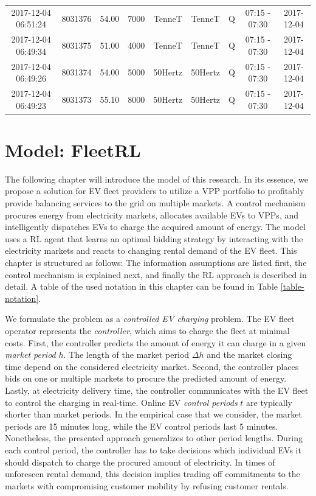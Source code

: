 \documentclass[a4paper, 12pt]{article}
\begin{document}
{\begin{table}
\begin{tabular}{c|cccccccc}
2017-12-04 06:51:24 & 8031376 & 54.00 & 7000 & TenneT & TenneT & Q & 07:15 - 07:30 & 2017-12-04\\
2017-12-04 06:49:34 & 8031375 & 51.00 & 4000 & TenneT & TenneT & Q & 07:15 - 07:30 & 2017-12-04\\
2017-12-04 06:49:26 & 8031374 & 54.00 & 5000 & 50Hertz & 50Hertz & Q & 07:15 - 07:30 & 2017-12-04\\
2017-12-04 06:49:23 & 8031373 & 55.10 & 8000 & 50Hertz & 50Hertz & Q & 07:15 - 07:30 & 2017-12-04\\
\hline
\hline
\end{tabular}
\end{table}
}

\clearpage

\section{Model: FleetRL}
\label{sec:orgfd42345}
The following chapter will introduce the model of this research. In its essence,
we propose a solution for EV fleet providers to utilize a VPP portfolio to
profitably provide balancing services to the grid on multiple markets. A control
mechanism procures energy from electricity markets, allocates available EVs to
VPPs, and intelligently dispatches EVs to charge the acquired amount of energy.
The model uses a RL agent that learns an optimal bidding strategy by interacting
with the electricity markets and reacts to changing rental demand of the EV
fleet. This chapter is structured as follows: The information assumptions are
listed first, the control mechanism is explained next, and finally the RL
approach is described in detail. A table of the used notation in this
chapter can be found in Table \ref{table-notation}.

We formulate the problem as a \emph{controlled EV charging} problem. The EV fleet
operator represents the \emph{controller}, which aims to charge the fleet at minimal
costs. First, the controller predicts the amount of energy it can charge in a
given \emph{market period} \(h\). The length of the market period \(\Delta h\) and the
market closing time depend on the considered electricity market. Second, the
controller places bids on one or multiple markets to procure the predicted
amount of energy. Lastly, at electricity delivery time, the controller
communicates with the EV fleet to control the charging in real-time. Online EV
\emph{control periods} \(t\) are typically shorter than market periods. In the
empirical case that we consider, the market periods are 15 minutes long, while
the EV control periods last 5 minutes. Nonetheless, the presented approach
generalizes to other period lengths. During each control period, the controller
has to take decisions which individual EVs it should dispatch to charge the
procured amount of electricity. In times of unforeseen rental demand, this
decision implies trading off commitments to the markets with compromising
customer mobility by refusing customer rentals.
\end{document}
